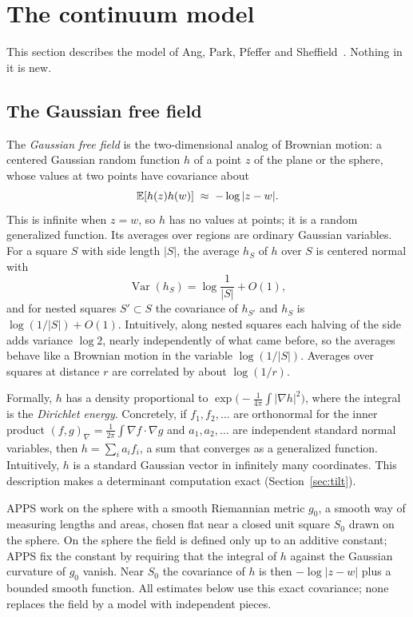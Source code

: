 \section{The continuum model}\label{sec:model}

This section describes the model of Ang, Park, Pfeffer and Sheffield~\cite[Section~6]{APPS}.
Nothing in it is new.

\subsection{The Gaussian free field}

The \emph{Gaussian free field} is the two-dimensional analog of Brownian motion: a centered
Gaussian random function $h$ of a point $z$ of the plane or the sphere, whose values at two points
have covariance about
\[
\mathbb{E}[h(z)h(w)]\;\approx\;-\log|z-w| .
\]
This is infinite when $z=w$, so $h$ has no values at points; it is a random generalized function.
Its averages over regions are ordinary Gaussian variables. For a square $S$ with side length $|S|$,
the average $h_S$ of $h$ over $S$ is centered normal with
\[
\operatorname{Var}(h_S)=\log\frac1{|S|}+O(1),
\]
and for nested squares $S'\subset S$ the covariance of $h_{S'}$ and $h_S$ is
$\log(1/|S|)+O(1)$. Intuitively, along nested squares each halving of the side adds variance
$\log2$, nearly independently of what came before, so the averages behave like a Brownian motion
in the variable $\log(1/|S|)$. Averages over squares at distance $r$ are correlated by about
$\log(1/r)$.

Formally, $h$ has a density proportional to $\exp\bigl(-\tfrac1{4\pi}\int|\nabla h|^2\bigr)$, where the
integral is the \emph{Dirichlet energy}. Concretely, if $f_1,f_2,\ldots$ are orthonormal for the inner
product $(f,g)_\nabla=\frac1{2\pi}\int\nabla f\cdot\nabla g$ and $a_1,a_2,\ldots$ are independent
standard normal variables, then $h=\sum_ia_if_i$, a sum that converges as a generalized function.
Intuitively, $h$ is a standard Gaussian vector in infinitely many coordinates. This description
makes a determinant computation exact (Section~\ref{sec:tilt}).

APPS work on the sphere with a smooth Riemannian metric $g_0$, a smooth way of measuring lengths
and areas, chosen flat near a closed unit square $S_0$ drawn on the sphere. On the sphere the field
is defined only up to an additive constant; APPS fix the constant by requiring that the integral of
$h$ against the Gaussian curvature of $g_0$ vanish. Near $S_0$ the covariance of $h$ is then $-\log|z-w|$ plus a bounded
smooth function. All estimates below use this exact covariance; none replaces the field by a model
with independent pieces.

